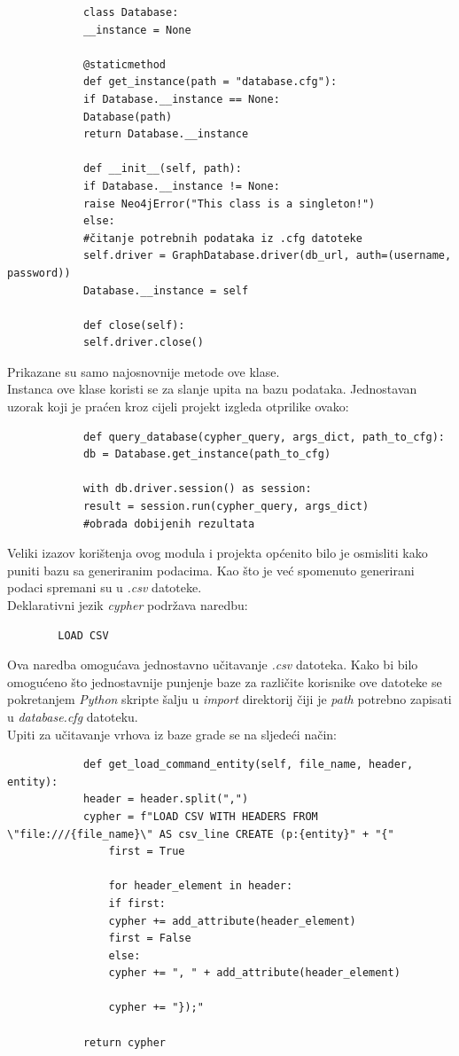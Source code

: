\documentclass[titlepage, 12pt]{scrartcl}
\begin{document}
	\begin{samepage}
		\begin{verbatim}
			class Database:
			__instance = None
			
			@staticmethod
			def get_instance(path = "database.cfg"):
			if Database.__instance == None:
			Database(path)
			return Database.__instance
			
			def __init__(self, path):
			if Database.__instance != None:
			raise Neo4jError("This class is a singleton!")
			else:
			#čitanje potrebnih podataka iz .cfg datoteke
			self.driver = GraphDatabase.driver(db_url, auth=(username, password))
			Database.__instance = self
			
			def close(self):
			self.driver.close()
		\end{verbatim}
	\end{samepage}
	Prikazane su samo najosnovnije metode ove klase. \\
	Instanca ove klase koristi se za slanje upita na bazu podataka. Jednostavan uzorak koji je praćen kroz cijeli projekt izgleda otprilike ovako:
	\begin{samepage}
		\begin{verbatim}
			def query_database(cypher_query, args_dict, path_to_cfg):
			db = Database.get_instance(path_to_cfg)
			
			with db.driver.session() as session:
			result = session.run(cypher_query, args_dict)
			#obrada dobijenih rezultata
		\end{verbatim}
	\end{samepage}
	Veliki izazov korištenja ovog modula i projekta općenito bilo je osmisliti kako puniti bazu sa generiranim podacima. Kao što je već spomenuto generirani podaci spremani su u \emph{.csv} datoteke. \\
	Deklarativni jezik \emph{cypher} podržava naredbu: 
	\begin{verbatim}
		LOAD CSV
	\end{verbatim}
	Ova naredba omogućava jednostavno učitavanje \emph{.csv} datoteka. Kako bi bilo omogućeno što jednostavnije punjenje baze za različite korisnike ove datoteke se pokretanjem \emph{Python} skripte šalju u \emph{import} direktorij čiji je \emph{path} potrebno zapisati u \emph{database.cfg} datoteku. \\
	Upiti za učitavanje vrhova iz baze grade se na sljedeći način:
	\begin{samepage}
		\begin{verbatim}
			def get_load_command_entity(self, file_name, header, entity):
			header = header.split(",")
			cypher = f"LOAD CSV WITH HEADERS FROM \"file:///{file_name}\" AS csv_line CREATE (p:{entity}" + "{"
				first = True
				
				for header_element in header:
				if first:
				cypher += add_attribute(header_element)
				first = False
				else:
				cypher += ", " + add_attribute(header_element)
				
				cypher += "});"
			
			return cypher
		\end{verbatim}
	\end{samepage}
\end{document}
